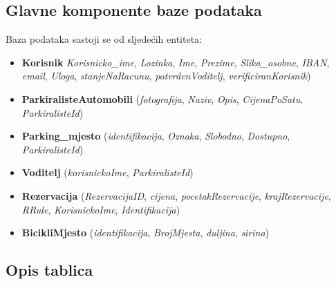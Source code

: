 \subsection{Glavne komponente baze podataka}
Baza podataka sastoji se od sljedećih entiteta:

\begin{itemize}
	\item \textbf{Korisnik} \hspace{0.15cm}\textit{Korisnicko\_ime}, \textit{Lozinka}, \textit{Ime}, \textit{Prezime}, \textit{Slika\_osobne}, \textit{IBAN}, \textit{email}, \textit{Uloga}, \textit{stanjeNaRacunu}, \textit{potvrdenVoditelj}, \textit{verificiranKorisnik})
	
	
	\item \textbf{ParkiralisteAutomobili} (\textit{fotografija}, \textit{Naziv}, \textit{Opis}, \textit{CijenaPoSatu}, \textit{ParkiralisteId}) 
	
	\item \textbf{Parking\_mjesto} (\textit{identifikacija}, \textit{Oznaka}, \textit{Slobodno}, \textit{Dostupno}, \textit{ParkiralisteId})
	
	\item \textbf{Voditelj} (\textit{korisnickoIme}, \textit{ParkiralisteId})
	
	\item \textbf{Rezervacija} (\textit{RezervacijaID}, \textit{cijena}, \textit{pocetakRezervacije}, \textit{krajRezervacije}, \textit{RRule}, \textit{KorisnickoIme}, \textit{Identifikacija})
	
	\item \textbf{BicikliMjesto} (\textit{identifikacija}, \textit{BrojMjesta}, \textit{duljina}, \textit{sirina})
\end{itemize}



\subsection{Opis tablica}





